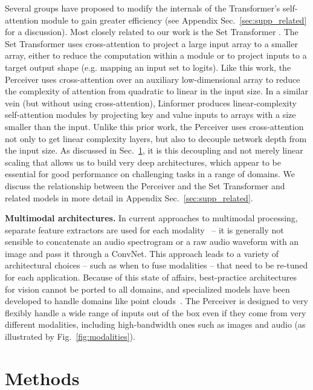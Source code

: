 \documentclass{article}
\begin{document}
Several groups have proposed to modify the internals of the Transformer's self-attention module to gain greater efficiency (see Appendix Sec.~\ref{sec:supp_related} for a discussion). Most closely related to our work is the Set Transformer \cite{lee2019set}. The Set Transformer uses cross-attention to project a large input array to a smaller array, either to reduce the computation within a module or to project inputs to a target output shape (e.g. mapping an input set to logits). Like this work, the Perceiver uses cross-attention over an auxiliary low-dimensional array to reduce the complexity of attention from quadratic to linear in the input size. In a similar vein (but without using cross-attention), Linformer \cite{wang2020linformer} produces linear-complexity self-attention modules by projecting key and value inputs to arrays with a size smaller than the input. Unlike this prior work, the Perceiver uses cross-attention not only to get linear complexity layers, but also to decouple network depth from the input size. As discussed in Sec.~\ref{sec:methods}, it is this decoupling and not merely linear scaling that allows us to build very deep architectures, which appear to be essential for good performance on challenging tasks in a range of domains. We discuss the relationship between the Perceiver and the Set Transformer and related models in more detail in Appendix Sec.~\ref{sec:supp_related}.

\noindent \textbf{Multimodal architectures.}
In current approaches to multimodal processing, separate feature extractors are used for each modality~\cite{kaiser2017one,arandjelovic2018objects,wang2020makes,chen2019uniter,alayrac2020self,lee2020making,xiao2020audiovisual} -- it is generally not sensible to concatenate an audio spectrogram or a raw audio waveform with an image and pass it through a ConvNet. This approach leads to a variety of architectural choices -- such as when to fuse modalities -- that need to be re-tuned for each application. Because of this state of affairs, best-practice architectures for vision cannot be ported to all domains, and specialized models have been developed to handle domains like point clouds~\cite{qi2017pointnet++,guo2020pct}. The Perceiver is designed to very flexibly handle a wide range of inputs out of the box even if they come from very different modalities, including high-bandwidth ones such as images and audio (as illustrated by Fig.~\ref{fig:modalities}).

\section{Methods}
\label{sec:methods}
\end{document}

